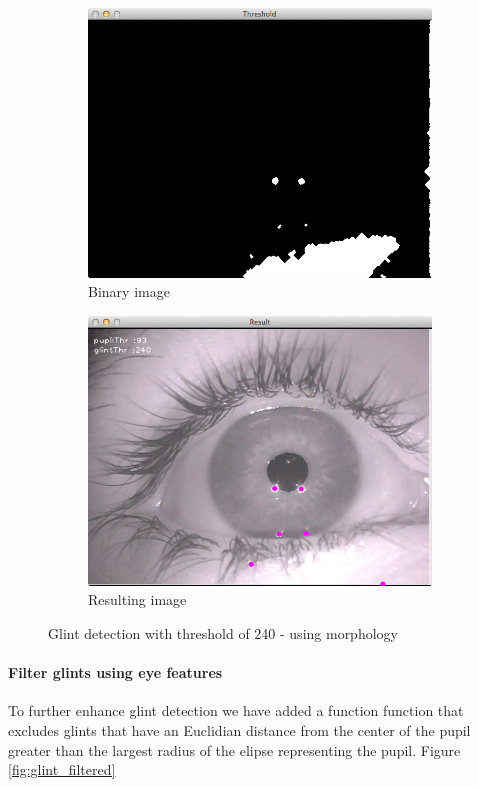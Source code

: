 \documentclass[a4paper,11pt]{article}
\begin{document}
\begin{figure}[H]
\centering
\begin{subfigure}{.48\textwidth}
  \centering
  \includegraphics[width=.8\linewidth]{glint_bin_morph}
  \caption{Binary image}
  \label{fig:glint_binary_morph}
\end{subfigure}
\begin{subfigure}{.48\textwidth}
  \centering
  \includegraphics[width=.8\linewidth]{glint_result_morph}
  \caption{Resulting image}
  \label{fig:glint_result_morph_morph}
\end{subfigure}
\caption{Glint detection with threshold of 240 - using morphology}
\label{fig:glint_morph}
\end{figure}

\paragraph{Filter glints using eye features} To further enhance glint detection we have added a function function that excludes glints that have an Euclidian distance from the center of the pupil greater than the largest radius of the elipse representing the pupil. Figure \ref{fig:glint_filtered}
\end{document}
